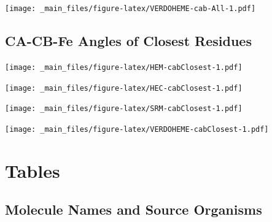 \documentclass[a4paper, nobind]{templates/ociamthesis}
\let\origfigure\figure
\let\endorigfigure\endfigure
\renewenvironment{figure}[1][2] {
    \expandafter\origfigure\expandafter[H]
} {
    \endorigfigure
}
\begin{document}
\begin{figure}
\centering
\texttt{[image: \_main\_files/figure-latex/VERDOHEME-cab-All-1.pdf]}
\caption{\label{fig:VERDOHEME-cab-All}VERDOHEME: All CA-CB-Fe Angles}
\end{figure}

\hypertarget{figs-cabClosest}{%
\section{CA-CB-Fe Angles of Closest Residues}\label{figs-cabClosest}}

\begin{figure}
\centering
\texttt{[image: \_main\_files/figure-latex/HEM-cabClosest-1.pdf]}
\caption{\label{fig:HEM-cabClosest}HEM: CACBFe Angles of Closest Residues}
\end{figure}

\begin{figure}
\centering
\texttt{[image: \_main\_files/figure-latex/HEC-cabClosest-1.pdf]}
\caption{\label{fig:HEC-cabClosest}HEC: CACBFe Angles of Closest Residues}
\end{figure}

\begin{figure}
\centering
\texttt{[image: \_main\_files/figure-latex/SRM-cabClosest-1.pdf]}
\caption{\label{fig:SRM-cabClosest}SRM: CACBFe Angles of Closest Residues}
\end{figure}

\begin{figure}
\centering
\texttt{[image: \_main\_files/figure-latex/VERDOHEME-cabClosest-1.pdf]}
\caption{\label{fig:VERDOHEME-cabClosest}VERDOHEME: CACBFe Angles of Closest Residues}
\end{figure}

\hypertarget{a-tables}{%
\chapter{Tables}\label{a-tables}}

\minitoc

\hypertarget{molOrgSec}{%
\section{Molecule Names and Source Organisms}\label{molOrgSec}}
\end{document}
